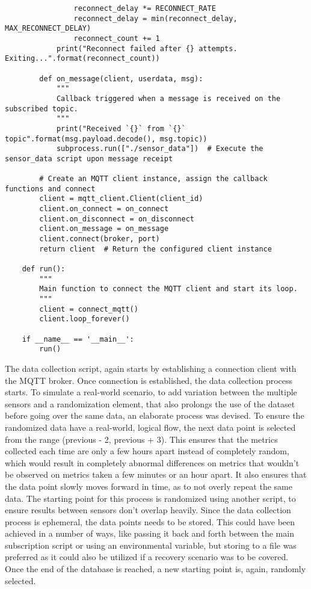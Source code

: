 \begin{verbatim}
                reconnect_delay *= RECONNECT_RATE
                reconnect_delay = min(reconnect_delay, MAX_RECONNECT_DELAY)
                reconnect_count += 1
            print("Reconnect failed after {} attempts. Exiting...".format(reconnect_count))

        def on_message(client, userdata, msg):
            """
            Callback triggered when a message is received on the subscribed topic.
            """
            print("Received `{}` from `{}` topic".format(msg.payload.decode(), msg.topic))
            subprocess.run(["./sensor_data"])  # Execute the sensor_data script upon message receipt

        # Create an MQTT client instance, assign the callback functions and connect
        client = mqtt_client.Client(client_id)
        client.on_connect = on_connect
        client.on_disconnect = on_disconnect
        client.on_message = on_message
        client.connect(broker, port)
        return client  # Return the configured client instance

    def run():
        """
        Main function to connect the MQTT client and start its loop.
        """
        client = connect_mqtt()
        client.loop_forever()

    if __name__ == '__main__':
        run()
\end{verbatim}

The data collection script, again starts by establishing a connection client with the MQTT broker. Once connection is established, the data collection process starts. To simulate a real-world scenario, to add variation between the multiple sensors and a randomization element, that also prolongs the use of the dataset before going over the same data, an elaborate process was devised. To ensure the randomized data have a real-world, logical flow, the next data point is selected from the range (previous - 2, previous + 3). This ensures that the metrics collected each time are only a few hours apart instead of completely random, which would result in completely abnormal differences on metrics that wouldn't be observed on metrics taken a few minutes or an hour apart. It also ensures that the data point slowly moves forward in time, as to not overly repeat the same data. The starting point for this process is randomized using another script, to ensure results between sensors don't overlap heavily. Since the data collection process is ephemeral, the data points needs to be stored. This could have been achieved in a number of ways, like passing it back and forth between the main subscription script or using an environmental variable, but storing to a file was preferred as it could also be utilized if a recovery scenario was to be covered. Once the end of the database is reached, a new starting point is, again, randomly selected.


